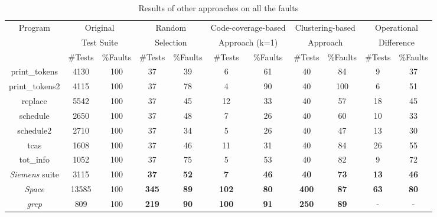\documentclass{sig-alternate}
\begin{document}
\begin{table}[htbp]
\caption{Results of other approaches on all the
faults}\label{tab:other} \center
\begin{tabular}{|c|c|c|c|c|c|c|c|c|c|c|}

\hline Program   & \multicolumn{2}{c}{Original } \vline &
\multicolumn{2}{c}{Random} \vline &
\multicolumn{2}{c}{Code-coverage-based} \vline &
\multicolumn{2}{c}{Clustering-based} \vline &
\multicolumn{2}{c}{Operational} \vline
    \\

& \multicolumn{2}{c}{Test Suite} \vline &
\multicolumn{2}{c}{Selection} \vline & \multicolumn{2}{c}{Approach
(k=1)} \vline & \multicolumn{2}{c}{Approach} \vline &
\multicolumn{2}{c}{Difference} \vline
   \\

 \cline{2-11}  & \#Tests &   \%Faults & \#Tests &   \%Faults &
\#Tests &   \%Faults & \#Tests &   \%Faults & \#Tests &   \%Faults  \\


\hline  print\_tokens   &   4130    &   100 &   37  &   39&   6   &   61  &   40  &   84  &   9   &   37   \\
\hline  print\_tokens2  &   4115    &   100 &   37  &   78&   4   &   90  &   40  &   100 &   6   &   51    \\
\hline  replace &   5542    &   100 &   37  &   45&   12  &   33  &   40  &   57  &   18  &   45    \\
\hline  schedule    &   2650    &   100 &   37  &   48&   7   &   26  &   40  &   60  &   10  &   33   \\
\hline  schedule2   &   2710    &   100 &   37  &   34&   5   &   26  &   40  &   47  &   13  &   30    \\
\hline  tcas    &   1608    &   100 &   37  &   46&   11  &   31  &   40  &   84  &   26  &   55    \\
\hline  tot\_info &   1052    &   100 &   37  &   75&   5   &   53  &   40  &   82  &   9   &   72   \\
\hline  \emph{Siemens} suite   &   3115    &   100 &   \textbf{37}  &   \textbf{52}&   \textbf{7}   &   \textbf{46}  &   \textbf{40}  &   \textbf{73}  &   \textbf{13}  &   \textbf{46}   \\
\hline  \emph{Space}   &   13585   &   100 &   \textbf{345} &   \textbf{89}&   \textbf{102} &   \textbf{80}  &   \textbf{400} &   \textbf{87}  &   \textbf{63}  &   \textbf{80}  \\
\hline  \emph{grep}    &   809 &   100 &   \textbf{219} &   \textbf{90}&   \textbf{100} &   \textbf{91}  &   \textbf{250} &   \textbf{89}  &   -   &   -     \\

\hline
\end{tabular}
\end{table}
\end{document}
